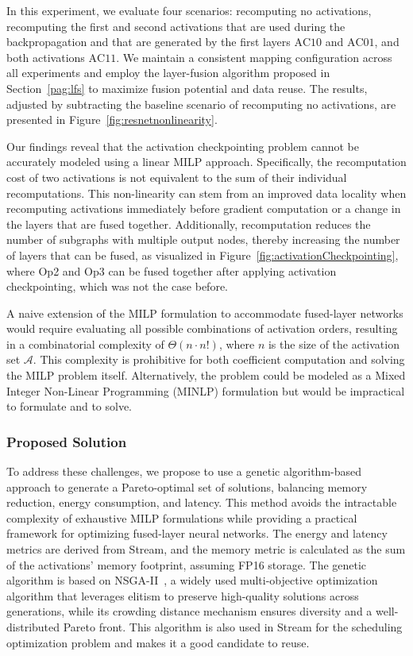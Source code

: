 \documentclass[lettersize,journal]{IEEEtran}
\begin{document}
In this experiment, we evaluate four scenarios: recomputing no activations, recomputing the first and second activations that are used during the backpropagation and that are generated by the first layers $\text{AC}10$ and $\text{AC}01$, and both activations $\text{AC}11$. We maintain a consistent mapping configuration across all experiments and employ the layer-fusion algorithm proposed in Section~\ref{pag:lfs} to maximize fusion potential and data reuse. The results, adjusted by subtracting the baseline scenario of recomputing no activations, are presented in Figure~\ref{fig:resnetnonlinearity}.

Our findings reveal that the activation checkpointing problem cannot be accurately modeled using a linear MILP approach. Specifically, the recomputation cost of two activations is not equivalent to the sum of their individual recomputations. This non-linearity can stem from an improved data locality when recomputing activations immediately before gradient computation or a change in the layers that are fused together. Additionally, recomputation reduces the number of subgraphs with multiple output nodes, thereby increasing the number of layers that can be fused, as visualized in Figure~\ref{fig:activationCheckpointing}, where Op2 and Op3 can be fused together after applying activation checkpointing, which was not the case before.

A naive extension of the MILP formulation to accommodate fused-layer networks would require evaluating all possible combinations of activation orders, resulting in a combinatorial complexity of $\Theta(n \cdot n!)$, where $n$ is the size of the activation set $\mathcal{A}$. This complexity is prohibitive for both coefficient computation and solving the MILP problem itself. Alternatively, the problem could be modeled as a Mixed Integer Non-Linear Programming (MINLP) formulation but would be impractical to formulate and to solve. 

\subsubsection{Proposed Solution}
To address these challenges, we propose to use a genetic algorithm-based approach to generate a Pareto-optimal set of solutions, balancing memory reduction, energy consumption, and latency. This method avoids the intractable complexity of exhaustive MILP formulations while providing a practical framework for optimizing fused-layer neural networks. The energy and latency metrics are derived from Stream, and the memory metric is calculated as the sum of the activations' memory footprint, assuming FP16 storage. The genetic algorithm is based on NSGA-II~\cite{NSGAII2002}, a widely used multi-objective optimization algorithm that leverages elitism to preserve high-quality solutions across generations, while its crowding distance mechanism ensures diversity and a well-distributed Pareto front. This algorithm is also used in Stream for the scheduling optimization problem and makes it a good candidate to reuse.
\end{document}
